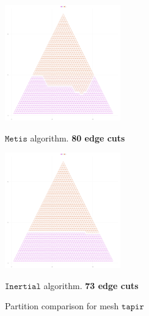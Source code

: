 \documentclass[unicode,11pt,a4paper,oneside,numbers=endperiod,openany]{scrartcl}
\begin{document}
\begin{figure}[h!]
    \begin{minipage}{0.5\textwidth}
        \centering
        \includegraphics[height=5cm]{fig/plot/bisection/bisection-tapir-metis-cut_80.0}
        \caption{$\texttt {Metis}$ algorithm. \textbf{80 edge cuts}}
    \end{minipage}
        \begin{minipage}{0.5\textwidth}
        \centering
        \includegraphics[height=5cm]{fig/plot/bisection/bisection-tapir-inertial-cut_73.0}
        \caption{$\texttt {Inertial}$ algorithm. \textbf{73 edge cuts}}
    \end{minipage}
    \caption*{Partition comparison for mesh $\texttt {tapir}$}
\end{figure}\\
\end{document}
